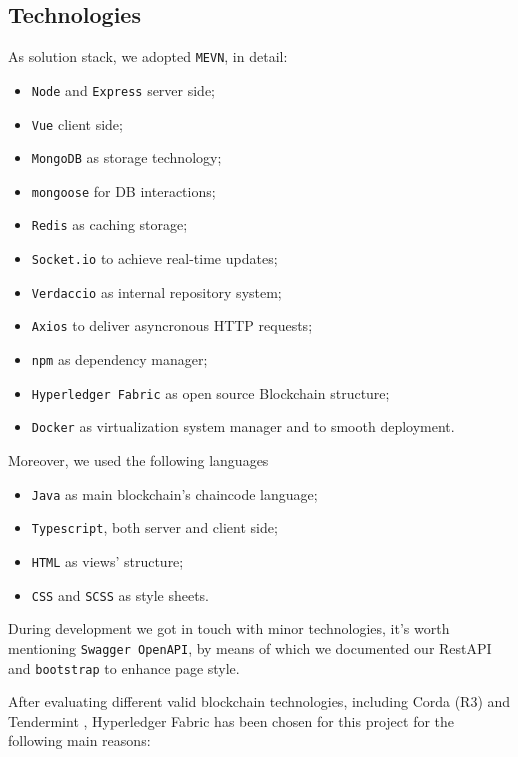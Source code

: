 \documentclass{scrartcl}
\begin{document}
\fi

\subsection{Technologies}
\label{sec:technologies}

As solution stack, we adopted \texttt{MEVN}, in detail:
\begin{itemize}
    \item \texttt{Node} and \texttt{Express} server side;
    \item \texttt{Vue} client side;
    \item \texttt{MongoDB} as storage technology;
    \item \texttt{mongoose} for DB interactions;
    \item \texttt{Redis} as caching storage;
    \item \texttt{Socket.io} to achieve real-time updates;
    \item \texttt{Verdaccio} as internal repository system;
    \item \texttt{Axios} to deliver asyncronous HTTP requests;
    \item \texttt{npm} as dependency manager;
    \item \texttt{Hyperledger Fabric} as open source Blockchain structure;
    \item \texttt{Docker} as virtualization system manager and to smooth deployment.
\end{itemize}

Moreover, we used the following languages
\begin{itemize}
    \item \texttt{Java} as main blockchain's chaincode language;
    \item \texttt{Typescript}, both server and client side;
    \item \texttt{HTML} as views' structure;
    \item \texttt{CSS} and \texttt{SCSS} as style sheets.
\end{itemize}

During development we got in touch with minor technologies, it's worth mentioning \texttt{Swagger OpenAPI}, by means of which we documented our RestAPI and \texttt{bootstrap} to enhance page style.

\iffalse

After evaluating different valid blockchain technologies, including Corda (R3) \cite{corda} and Tendermint \cite{tendermint}, Hyperledger Fabric has been chosen for this project for the following main reasons:
\end{document}
